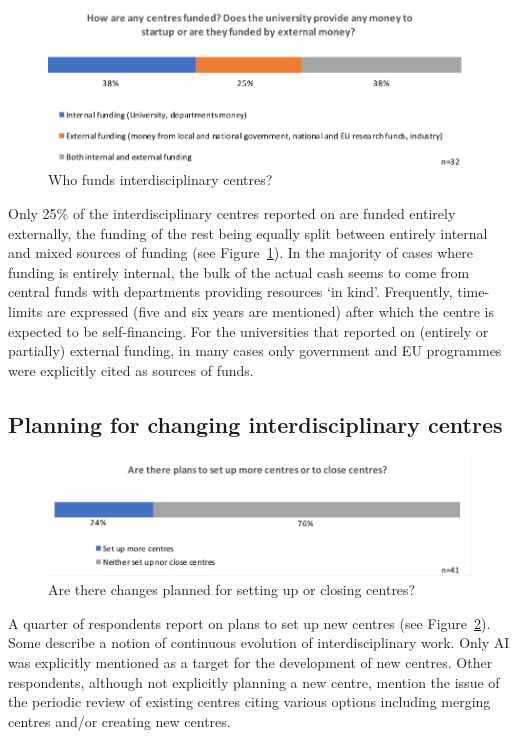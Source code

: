 \begin{figure}[h]
\centering
\includegraphics[width = \linewidth]{charts/5e.jpg}
\caption{Who funds interdisciplinary centres?}
\label{sect5:funding}
\end{figure}

Only 25\% of the interdisciplinary centres reported on are funded entirely externally, the funding of the rest being equally split between entirely internal and mixed sources of funding (see Figure~\ref{sect5:funding}). In the majority of cases where funding is entirely internal, the bulk of the actual cash seems to come from central funds with departments providing resources `in kind'. Frequently, time-limits are expressed (five and six years are mentioned) after which the centre is expected to be self-financing. For the universities that reported on (entirely or partially) external funding, in many cases only government and EU programmes were explicitly cited as sources of funds.

\subsection{Planning for changing interdisciplinary centres}

\begin{figure}[h]
\centering
\includegraphics[width = \linewidth]{charts/5f.jpg}
\caption{Are there changes planned for setting up or closing centres?}
\label{sect5:changes}
\end{figure}

A quarter of respondents report on plans to set up new centres (see Figure~\ref{sect5:changes}). Some describe a notion of continuous evolution of interdisciplinary work. Only AI was explicitly mentioned as a target for the development of new centres. Other respondents, although not explicitly planning a new centre, mention the issue of the periodic review of existing centres citing various options including merging centres and/or creating new centres.  

